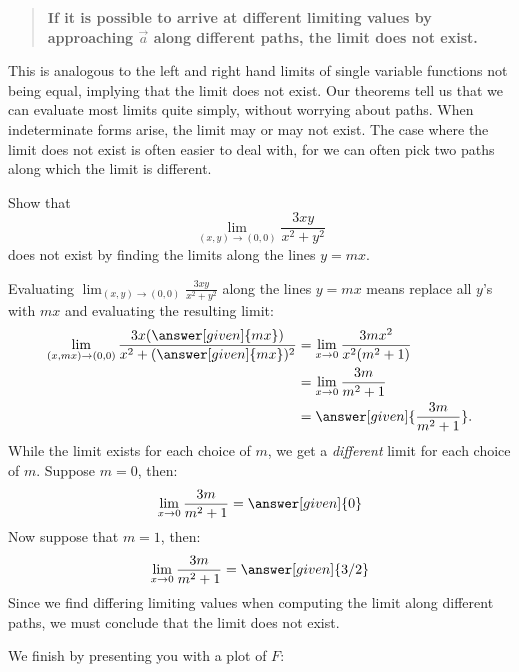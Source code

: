 \documentclass{ximera}
\begin{document}
\begin{quote}
  \textbf{If it is possible to arrive at different limiting values by
    approaching $\vec{a}$ along different paths, the limit does not exist.}
\end{quote}
This is analogous to the left and right hand limits of single variable
functions not being equal, implying that the limit does not exist.
Our theorems tell us that we can evaluate most limits quite simply,
without worrying about paths. When indeterminate forms arise, the
limit may or may not exist.
 The case where the limit does not
exist is often easier to deal with, for we can often pick two paths
along which the limit is different.


\begin{example}
  Show that
  \[
  \lim_{(x,y)\to(0,0)} \frac{3xy}{x^2+y^2}
  \]
  does not exist by finding the limits along the lines $y=mx$.
  \begin{explanation}
    Evaluating $\lim_{(x,y)\to(0,0)} \frac{3xy}{x^2+y^2}$ along
    the lines $y=mx$ means replace all $y$'s with $mx$ and evaluating
    the resulting limit:
    \begin{align*}
      \lim_{(x,mx)\to(0,0)} \frac{3x(\answer[given]{m x})}{x^2+(\answer[given]{mx})^2} &=\lim_{x\to0} \frac{3mx^2}{x^2(m^2+1)}\\
      &= \lim_{x\to 0}\frac{3m}{m^2+1}\\
      &= \answer[given]{\frac{3m}{m^2+1}}.
    \end{align*}
    While the limit exists for each choice of $m$, we get a
    \textit{different} limit for each choice of $m$. Suppose $m=0$,
    then:
    \[
    \lim_{x\to 0}\frac{3m}{m^2+1} = \answer[given]{0}
    \]
    Now suppose that $m=1$, then:
    \[
    \lim_{x\to 0}\frac{3m}{m^2+1} = \answer[given]{3/2}
    \]
    Since we find differing limiting values when computing the limit
    along different paths, we must conclude that the limit does not
    exist.
    \begin{onlineOnly}
      We finish by presenting you with a plot of $F$:
      \begin{center}
      \end{center}
    \end{onlineOnly}
  \end{explanation}
\end{example}
\end{document}
